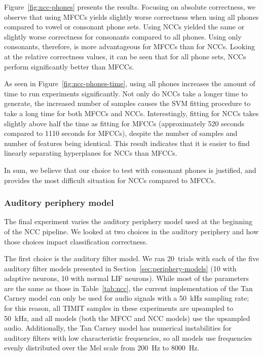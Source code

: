 Figure~\ref{fig:ncc-phones} presents the results.
Focusing on absolute correctness,
we observe that using MFCCs
yields slightly worse correctness
when using all phones compared
to vowel or consonant phone sets.
Using NCCs yielded the same
or slightly worse correctness
for consonants compared to all phones.
Using only consonants, therefore,
is more advantageous for MFCCs
than for NCCs.
Looking at the relative correctness values,
it can be seen that for all phone sets,
NCCs perform significantly better
than MFCCs.


As seen in Figure~\ref{fig:ncc-phones-time},
using all phones increases the
amount of time to run experiments significantly.
Not only do NCCs take a longer time to generate,
the increased number of samples
causes the SVM fitting procedure
to take a long time
for both MFCCs and NCCs.
Interestingly, fitting for NCCs
takes slightly above half
the time as fitting for MFCCs
(approximately 520 seconds
compared to 1110 seconds for MFCCs),
despite the number of samples
and number of features being identical.
This result indicates that it is
easier to find linearly separating hyperplanes
for NCCs than MFCCs.

In sum, we believe that our choice to
test with consonant phones
is justified,
and provides the most difficult
situation for NCCs compared to MFCCs.

\subsubsection{Auditory periphery model}
\label{sec:results-periphmodel}

The final experiment varies the auditory periphery model
used at the beginning of the NCC pipeline.
We looked at two choices in the auditory periphery
and how those choices impact classification correctness.

The first choice is the auditory filter model.
We ran 20~trials with each of the five
auditory filter models presented
in Section~\ref{sec:periphery-models}
(10 with adaptive neurons, 10 with normal LIF neurons).
While most of the parameters are the same
as those in Table~\ref{tab:ncc},
the current implementation of the Tan Carney model
can only be used for audio signals
with a 50~kHz sampling rate;
for this reason, all TIMIT samples
in these experiments
are upsampled to 50~kHz,
and all models (both the MFCC and NCC models)
use the upsampled audio.
Additionally, the Tan Carney model
has numerical instabilities for auditory filters
with low characteristic frequencies,
so all models use frequencies
evenly distributed over the Mel scale
from 200~Hz to 8000~Hz.

